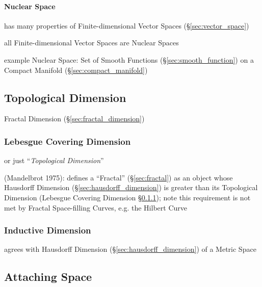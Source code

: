 \paragraph{Nuclear Space}\label{sec:nuclear_space}\hfill

has many properties of Finite-dimensional Vector Spaces
(\S\ref{sec:vector_space})

all Finite-dimensional Vector Spaces are Nuclear Spaces

example Nuclear Space: Set of Smooth Functions
(\S\ref{sec:smooth_function}) on a Compact Manifold
(\S\ref{sec:compact_manifold})



\subsection{Topological Dimension}\label{sec:topological_dimension}

\fist Fractal Dimension (\S\ref{sec:fractal_dimension})



\subsubsection{Lebesgue Covering Dimension}\label{sec:lebesgue_dimension}

or just ``\emph{Topological Dimension}''

(Mandelbrot 1975): defines a ``Fractal'' (\S\ref{sec:fractal}) as an object
whose Hausdorff Dimension (\S\ref{sec:hausdorff_dimension}) is greater than its
Topological Dimension (Lebesgue Covering Dimension
\S\ref{sec:lebesgue_dimension}); note this requirement is not met by Fractal
Space-filling Curves, e.g. the Hilbert Curve



\subsubsection{Inductive Dimension}\label{sec:inductive_dimension}

agrees with Hausdorff Dimension (\S\ref{sec:hausdorff_dimension}) of a Metric
Space



\subsection{Attaching Space}\label{sec:attaching_space}

